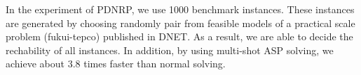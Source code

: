 \documentclass[dvipdfmx,a4paper]{jsarticle}
\begin{document}
In the experiment of PDNRP, we use 1000 benchmark instances.
%
These instances are generated by choosing randomly pair from feasible
models of a practical scale problem (\textsf{fukui-tepco}) published in DNET.
%
As a result, we are able to decide the rechability of all instances.
%
In addition, by using multi-shot ASP solving, we achieve about 3.8 times 
faster than normal solving.

\end{document}
